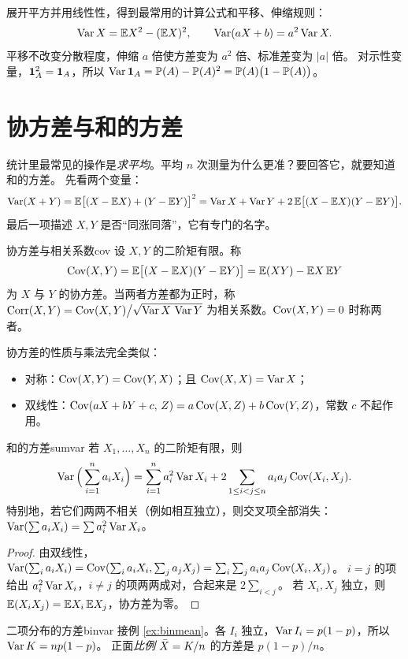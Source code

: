 展开平方并用线性性，得到最常用的计算公式和平移、伸缩规则：
\begin{equation}\label{eq:varformula}
\operatorname{Var} X=\mathbb{E} X^2-(\mathbb{E} X)^2,\qquad \operatorname{Var}(aX+b)=a^2\operatorname{Var} X .
\end{equation}
平移不改变分散程度，伸缩 $a$ 倍使方差变为 $a^2$ 倍、标准差变为 $|a|$ 倍。
对示性变量，$\mathbf{1}_A^2=\mathbf{1}_A$，所以 $\operatorname{Var}\mathbf{1}_A=\mathbb{P}(A)-\mathbb{P}(A)^2=\mathbb{P}(A)\big(1-\mathbb{P}(A)\big)$。

\section{协方差与和的方差}
\label{sec:cov}

统计里最常见的操作是\emph{求平均}。平均 $n$ 次测量为什么更准？要回答它，就要知道和的方差。
先看两个变量：
\[
\operatorname{Var}(X+Y)=\mathbb{E}\big[(X-\mathbb{E} X)+(Y-\mathbb{E} Y)\big]^2=\operatorname{Var} X+\operatorname{Var} Y+2\,\mathbb{E}\big[(X-\mathbb{E} X)(Y-\mathbb{E} Y)\big].
\]
最后一项描述 $X,Y$ 是否“同涨同落”，它有专门的名字。

\begin{definition}{协方差与相关系数}{cov}
设 $X,Y$ 的二阶矩有限。称
\[
\operatorname{Cov}(X,Y)=\mathbb{E}\big[(X-\mathbb{E} X)(Y-\mathbb{E} Y)\big]=\mathbb{E}(XY)-\mathbb{E} X\,\mathbb{E} Y
\]
为 $X$ 与 $Y$ 的协方差。当两者方差都为正时，称
$\operatorname{Corr}(X,Y)=\operatorname{Cov}(X,Y)\big/\sqrt{\operatorname{Var} X\,\operatorname{Var} Y}$ 为相关系数。$\operatorname{Cov}(X,Y)=0$ 时称两者。
\end{definition}

协方差的性质与乘法完全类似：
\begin{itemize}
\item 对称：$\operatorname{Cov}(X,Y)=\operatorname{Cov}(Y,X)$；且 $\operatorname{Cov}(X,X)=\operatorname{Var} X$；
\item 双线性：$\operatorname{Cov}(aX+bY+c,\,Z)=a\operatorname{Cov}(X,Z)+b\operatorname{Cov}(Y,Z)$，常数 $c$ 不起作用。
\end{itemize}

\begin{theorem}{和的方差}{sumvar}
若 $X_1,\dots,X_n$ 的二阶矩有限，则
\[
\operatorname{Var}\Big(\sum_{i=1}^n a_iX_i\Big)=\sum_{i=1}^n a_i^2\operatorname{Var} X_i+2\sum_{1\le i<j\le n}a_ia_j\operatorname{Cov}(X_i,X_j).
\]
特别地，若它们两两不相关（例如相互独立），则交叉项全部消失：$\operatorname{Var}(\sum a_iX_i)=\sum a_i^2\operatorname{Var} X_i$。
\end{theorem}
\begin{proof}
由双线性，$\operatorname{Var}(\sum_i a_iX_i)=\operatorname{Cov}(\sum_i a_iX_i,\sum_j a_jX_j)=\sum_i\sum_j a_ia_j\operatorname{Cov}(X_i,X_j)$。
$i=j$ 的项给出 $a_i^2\operatorname{Var} X_i$，$i\ne j$ 的项两两成对，合起来是 $2\sum_{i<j}$。
若 $X_i,X_j$ 独立，则 $\mathbb{E}(X_iX_j)=\mathbb{E} X_i\,\mathbb{E} X_j$，协方差为零。
\end{proof}

\begin{example}{二项分布的方差}{binvar}
接例 \ref{ex:binmean}。各 $I_i$ 独立，$\operatorname{Var} I_i=p(1-p)$，所以 $\operatorname{Var} K=np(1-p)$。
正面\emph{比例} $\bar{X}=K/n$ 的方差是 $p(1-p)/n$。
\end{example}

